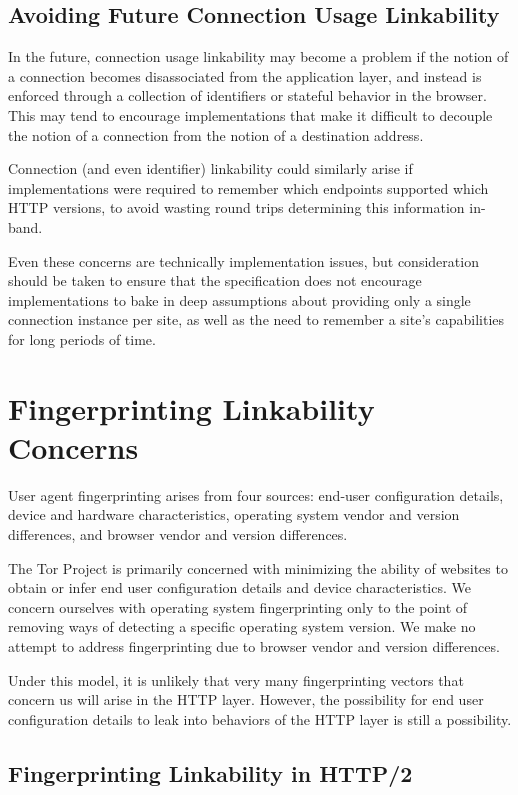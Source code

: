 \documentclass[letterpaper,11pt]{llncs}
\begin{document}
\subsection{Avoiding Future Connection Usage Linkability}

In the future, connection usage linkability may become a problem if the notion
of a connection becomes disassociated from the application layer, and instead
is enforced through a collection of identifiers or stateful behavior in the
browser. This may tend to encourage implementations that make it difficult to
decouple the notion of a connection from the notion of a destination address.

Connection (and even identifier) linkability could similarly arise if
implementations were required to remember which endpoints supported which HTTP
versions, to avoid wasting round trips determining this information in-band.

Even these concerns are technically implementation issues, but consideration
should be taken to ensure that the specification does not encourage
implementations to bake in deep assumptions about providing only a single
connection instance per site, as well as the need to remember a site's
capabilities for long periods of time.

\section{Fingerprinting Linkability Concerns}

User agent fingerprinting arises from four sources: end-user configuration
details, device and hardware characteristics, operating system vendor and
version differences, and browser vendor and version differences.

The Tor Project is primarily concerned with minimizing the ability of websites
to obtain or infer end user configuration details and device characteristics.
We concern ourselves with operating system fingerprinting only to the point of
removing ways of detecting a specific operating system version. We make no
attempt to address fingerprinting due to browser vendor and version
differences. %

Under this model, it is unlikely that very many fingerprinting vectors that
concern us will arise in the HTTP layer. However, the possibility for end user
configuration details to leak into behaviors of the HTTP layer is still a
possibility.

\subsection{Fingerprinting Linkability in HTTP/2}
\end{document}
